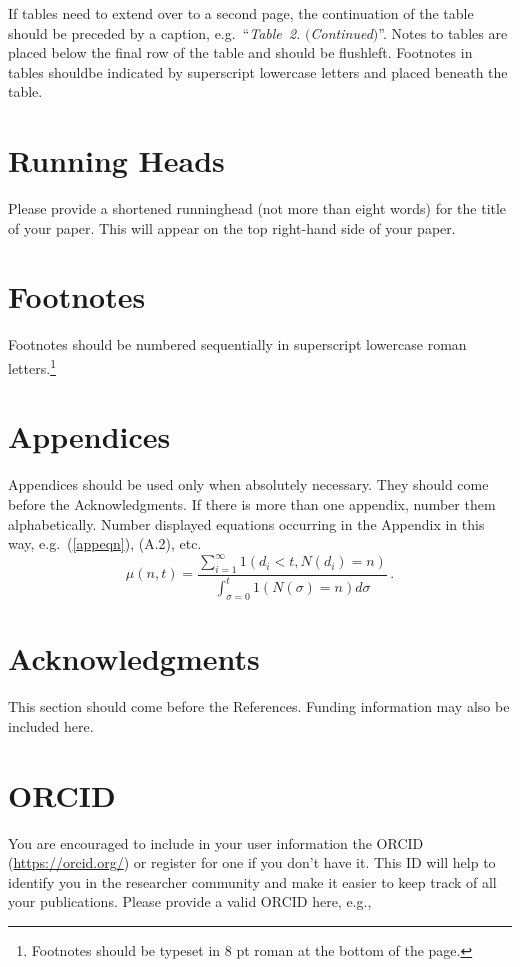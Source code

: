 \documentclass{ws-ijtaf}
\begin{document}
If tables need to extend over to a second page, the continuation of
the table should be preceded by a caption, e.g.~``{\it Table~2.}
$(${\it Continued}$)$''. Notes to tables are placed below the final
row of the table and should be flushleft.  Footnotes in tables
shouldbe indicated by superscript lowercase letters and placed beneath
the table.

\section{Running Heads}
Please provide a shortened runninghead (not more than eight words) for
the title of your paper. This will appear on the top right-hand side
of your paper.

\section{Footnotes}
Footnotes should be numbered sequentially in superscript
lowercase roman letters.\footnote{Footnotes should be
typeset in 8 pt roman at the bottom of the page.}

\appendix

\section{Appendices}

Appendices should be used only when absolutely necessary. They
should come\break
before the Acknowledgments. If there is more than one
appendix, number them alphabetically. Number displayed equations
occurring in the Appendix in this way, e.g.~(\ref{appeqn}), (A.2), etc.
\begin{equation}
\mu(n, t) = \frac{\sum^\infty_{i=1} 1(d_i < t, N(d_i)
= n)}{\int^t_{\sigma=0} 1(N(\sigma) = n)d\sigma}\,.
\label{appeqn}
\end{equation}

\section*{Acknowledgments}
This section should come before the References. Funding
information may also be included here.

\section*{ORCID}
You are encouraged to include in your user information the ORCID (\url{https://orcid.org/}) or register for one if you don't have it.
This ID will help to identify you in the researcher community and make it easier to keep track of all your publications.
Please provide a valid ORCID here, e.g.,
\end{document}
